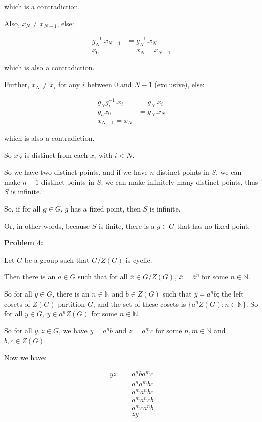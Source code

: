 \documentclass[a4paper,12pt]{article}
\newcommand{\tab}{\hspace{4mm}} %
\newcommand{\shunt}{\vspace{20mm}}
\newcommand{\N}{\mathbb{N}}
\begin{document}
\tab which is a contradiction.

\tab Also, $x_N \neq x_{N-1}$, else:

\begin{align*}
g_N^{-1}.x_{N-1} &= g_N^{-1}.x_N\\
x_0&= x_N=x_{N-1}
\end{align*} 

\tab which is also a contradiction.

\tab Further, $x_N \neq x_{i}$ for any $i$ between $0$ and $N-1$ (exclusive), else:

\begin{align*}
g_Ng_i^{-1}.x_i &= g_N.x_i\\
g_nx_0 &= g_N.x_N\\
x_{N-1} = x_N
\end{align*} 

\tab which is also a contradiction.

\tab So $x_N$ is distinct from each $x_i$ with $i < N$.

\tab So we have two distinct points, and if we have $n$ distinct points in $S$, we can make $n+1$ distinct points in $S$; we can make infinitely many distinct points, thus $S$ is infinite.

So, if for all $g \in G$, $g$ has a fixed point, then $S$ is infinite.

Or, in other words, because $S$ is finite, there is a $g \in G$ that has no fixed point.

\shunt

{\bf Problem 4:}

Let $G$ be a group such that $G/Z(G)$ is cyclic.

Then there is an $a \in G$ such that for all $\overline{x} \in G/Z(G)$, $\overline{x} = \overline{a}^n$ for some $n \in \N$.

So for all $y \in G$, there is an $n \in \N$ and $b \in Z(G)$ such that $y = a^nb$; the left cosets of $Z(G)$ partition $G$, and the set of these cosets is $\{a^nZ(G): n \in \N\}$. So for all $y \in G$, $y \in a^nZ(G)$ for some $n \in \N$. 

So for all $y, z \in G$, we have $y = a^nb$ and $z=a^mc$ for some $n,m \in \N$ and $b,c \in Z(G)$.

Now we have:

\begin{align*}
yz &= a^nba^mc\\
&=a^na^mbc\\
&=a^ma^nbc\\
&=a^ma^ncb\\
&=a^mca^nb\\
&=zy
\end{align*}
\end{document}
